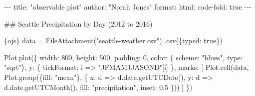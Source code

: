 \documentclass[
  letterpaper,
]{article}
\newenvironment{Shaded}{}{}
\newcommand{\AnnotationTok}[1]{\textcolor[rgb]{0.42,0.45,0.49}{#1}}
\newcommand{\AttributeTok}[1]{\textcolor[rgb]{0.84,0.23,0.29}{#1}}
\newcommand{\CommentTok}[1]{\textcolor[rgb]{0.42,0.45,0.49}{#1}}
\newcommand{\DataTypeTok}[1]{\textcolor[rgb]{0.84,0.23,0.29}{#1}}
\newcommand{\DecValTok}[1]{\textcolor[rgb]{0.00,0.36,0.77}{#1}}
\newcommand{\FloatTok}[1]{\textcolor[rgb]{0.00,0.36,0.77}{#1}}
\newcommand{\FunctionTok}[1]{\textcolor[rgb]{0.44,0.26,0.76}{#1}}
\newcommand{\InformationTok}[1]{\textcolor[rgb]{0.42,0.45,0.49}{#1}}
\newcommand{\KeywordTok}[1]{\textcolor[rgb]{0.84,0.23,0.29}{#1}}
\newcommand{\NormalTok}[1]{\textcolor[rgb]{0.14,0.16,0.18}{#1}}
\newcommand{\OperatorTok}[1]{\textcolor[rgb]{0.14,0.16,0.18}{#1}}
\newcommand{\StringTok}[1]{\textcolor[rgb]{0.01,0.18,0.38}{#1}}
\newcommand{\VerbatimStringTok}[1]{\textcolor[rgb]{0.01,0.18,0.38}{#1}}
\begin{document}
\begin{Shaded}
\begin{Highlighting}[]
\CommentTok{{-}{-}{-}}
\AnnotationTok{title:}\CommentTok{ "observable plot"}
\AnnotationTok{author:}\CommentTok{ "Norah Jones"}
\AnnotationTok{format:}\CommentTok{ }
\CommentTok{  html: }
\CommentTok{    code{-}fold: true}
\CommentTok{{-}{-}{-}}

\FunctionTok{\#\# Seattle Precipitation by Day (2012 to 2016)}

\InformationTok{\textasciigrave{}\textasciigrave{}\textasciigrave{}\{ojs\}}
\NormalTok{data }\OperatorTok{=} \FunctionTok{FileAttachment}\NormalTok{(}\StringTok{"seattle{-}weather.csv"}\NormalTok{)}
  \OperatorTok{.}\FunctionTok{csv}\NormalTok{(\{}\DataTypeTok{typed}\OperatorTok{:} \KeywordTok{true}\NormalTok{\})}
  
\NormalTok{Plot}\OperatorTok{.}\FunctionTok{plot}\NormalTok{(\{}
  \DataTypeTok{width}\OperatorTok{:} \DecValTok{800}\OperatorTok{,} \DataTypeTok{height}\OperatorTok{:} \DecValTok{500}\OperatorTok{,} \DataTypeTok{padding}\OperatorTok{:} \DecValTok{0}\OperatorTok{,}
  \DataTypeTok{color}\OperatorTok{:}\NormalTok{ \{ }\DataTypeTok{scheme}\OperatorTok{:} \StringTok{"blues"}\OperatorTok{,} \DataTypeTok{type}\OperatorTok{:} \StringTok{"sqrt"}\NormalTok{\}}\OperatorTok{,}
  \DataTypeTok{y}\OperatorTok{:}\NormalTok{ \{ }\DataTypeTok{tickFormat}\OperatorTok{:}\NormalTok{ i }\KeywordTok{=\textgreater{}} \StringTok{"JFMAMJJASOND"}\NormalTok{[i] \}}\OperatorTok{,}
  \DataTypeTok{marks}\OperatorTok{:}\NormalTok{ [}
\NormalTok{    Plot}\OperatorTok{.}\FunctionTok{cell}\NormalTok{(data}\OperatorTok{,}\NormalTok{ Plot}\OperatorTok{.}\FunctionTok{group}\NormalTok{(\{}\DataTypeTok{fill}\OperatorTok{:} \StringTok{"mean"}\NormalTok{\}}\OperatorTok{,}\NormalTok{ \{}
      \DataTypeTok{x}\OperatorTok{:}\NormalTok{ d }\KeywordTok{=\textgreater{}}\NormalTok{ d}\OperatorTok{.}\AttributeTok{date}\OperatorTok{.}\FunctionTok{getUTCDate}\NormalTok{()}\OperatorTok{,}
      \DataTypeTok{y}\OperatorTok{:}\NormalTok{ d }\KeywordTok{=\textgreater{}}\NormalTok{ d}\OperatorTok{.}\AttributeTok{date}\OperatorTok{.}\FunctionTok{getUTCMonth}\NormalTok{()}\OperatorTok{,}
      \DataTypeTok{fill}\OperatorTok{:} \StringTok{"precipitation"}\OperatorTok{,} 
      \DataTypeTok{inset}\OperatorTok{:} \FloatTok{0.5}
\NormalTok{    \}))}
\NormalTok{  ]}
\NormalTok{\})}
\VerbatimStringTok{\textasciigrave{}\textasciigrave{}\textasciigrave{}}
\end{Highlighting}
\end{Shaded}
\end{document}
